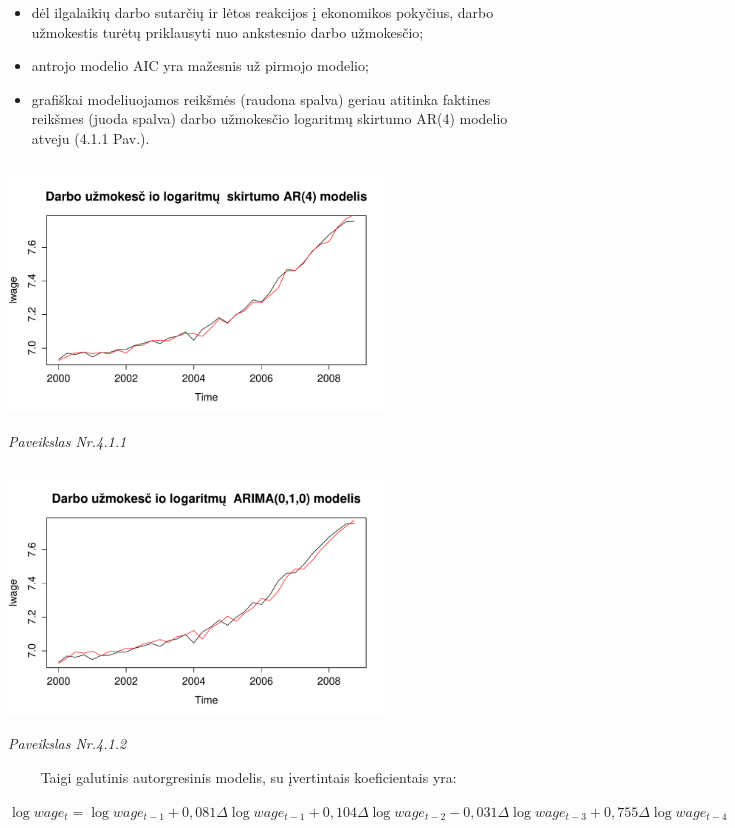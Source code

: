 \documentclass[12pt,a4paper]{article}
\theoremstyle{change}\newtheorem{salyga}{Uždavinys}
\begin{document}
\begin{itemize}
\item dėl ilgalaikių darbo sutarčių ir lėtos reakcijos į ekonomikos pokyčius, darbo užmokestis turėtų priklausyti nuo ankstesnio darbo užmokesčio;
\item antrojo  modelio AIC yra mažesnis už pirmojo modelio;
\item grafiškai modeliuojamos reikšmės (raudona spalva) geriau atitinka faktines reikšmes (juoda spalva) darbo užmokesčio logaritmų skirtumo AR(4) modelio atveju (4.1.1 Pav.). 
\end{itemize}
\vskip 8pt   

\begin{center}
\includegraphics[width=100mm,height=70mm]{arlwage7}
\\ \textit{Paveikslas Nr.4.1.1}
\end{center}
\vskip 8pt     
\begin{center}
\includegraphics[width=100mm,height=70mm]{arlwage2}
\\ \textit{Paveikslas Nr.4.1.2}
\end{center}
\vskip 8pt        
     
$\qquad$ Taigi galutinis autorgresinis modelis, su įvertintais koeficientais yra:
\begin{center}
  \large$ \log wage_t=\log wage_{t-1}+0,081\Delta\log wage_{t-1}+0,104\Delta\log wage_{t-2}-0,031\Delta\log wage_{t-3}+0,755\Delta\log wage_{t-4} $ 
\end{center}  
     
\end{document}
